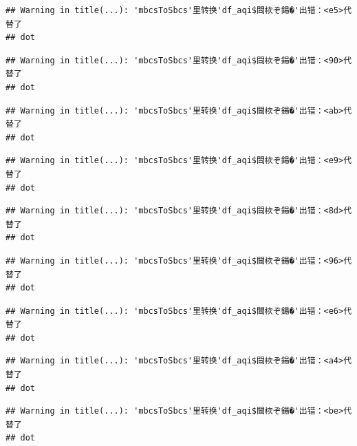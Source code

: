 \documentclass[]{book}
\newenvironment{Shaded}{\begin{snugshade}}{\end{snugshade}}
\newcommand{\DataTypeTok}[1]{\textcolor[rgb]{0.13,0.29,0.53}{#1}}
\newcommand{\KeywordTok}[1]{\textcolor[rgb]{0.13,0.29,0.53}{\textbf{#1}}}
\newcommand{\NormalTok}[1]{#1}
\newcommand{\OperatorTok}[1]{\textcolor[rgb]{0.81,0.36,0.00}{\textbf{#1}}}
\newcommand{\StringTok}[1]{\textcolor[rgb]{0.31,0.60,0.02}{#1}}
\begin{document}
\begin{verbatim}
## Warning in title(...): 'mbcsToSbcs'里转换'df_aqi$閸栨ぞ鍚�'出错：<e5>代替了
## dot
\end{verbatim}

\begin{verbatim}
## Warning in title(...): 'mbcsToSbcs'里转换'df_aqi$閸栨ぞ鍚�'出错：<90>代替了
## dot
\end{verbatim}

\begin{verbatim}
## Warning in title(...): 'mbcsToSbcs'里转换'df_aqi$閸栨ぞ鍚�'出错：<ab>代替了
## dot
\end{verbatim}

\begin{Shaded}
\end{Shaded}

\begin{verbatim}
## Warning in title(...): 'mbcsToSbcs'里转换'df_aqi$閸栨ぞ鍚�'出错：<e9>代替了
## dot
\end{verbatim}

\begin{verbatim}
## Warning in title(...): 'mbcsToSbcs'里转换'df_aqi$閸栨ぞ鍚�'出错：<8d>代替了
## dot
\end{verbatim}

\begin{verbatim}
## Warning in title(...): 'mbcsToSbcs'里转换'df_aqi$閸栨ぞ鍚�'出错：<96>代替了
## dot
\end{verbatim}

\begin{verbatim}
## Warning in title(...): 'mbcsToSbcs'里转换'df_aqi$閸栨ぞ鍚�'出错：<e6>代替了
## dot
\end{verbatim}

\begin{verbatim}
## Warning in title(...): 'mbcsToSbcs'里转换'df_aqi$閸栨ぞ鍚�'出错：<a4>代替了
## dot
\end{verbatim}

\begin{verbatim}
## Warning in title(...): 'mbcsToSbcs'里转换'df_aqi$閸栨ぞ鍚�'出错：<be>代替了
## dot
\end{verbatim}
\end{document}
